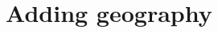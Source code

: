 \documentclass[12pt]{article}
\def\bceta{}
\def\bceta{}
\def\bceta{}}{
\def\bceta{}}
\theoremstyle{definition}
\theoremstyle{plain}
\begin{document}

\clearpage
	
\bceta

\clearpage
\appendix
\appendixpage

\section{Adding geography}

\label{sec:geography}
\end{document}

